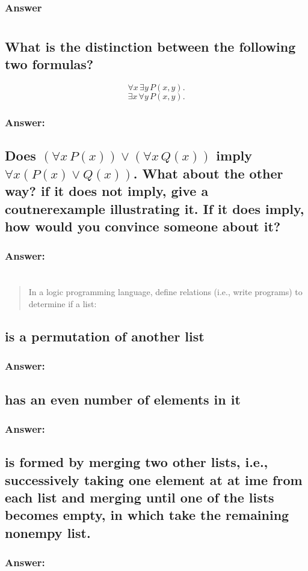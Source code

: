 \documentclass[titlepage]{article}\usepackage[]{graphicx}\usepackage[]{color}
\begin{document}
  \subsubsection{Answer}




  \section{}
  \subsection{What is the distinction between the following two formulas?}
  \[ \forall x \, \exists y \, P(x,y). \]
  \[ \exists x \, \forall y \, P(x,y). \]
  \subsubsection{Answer:}



  \subsection{Does $(\forall x \, P(x)) \lor (\forall x \, Q(x))$ imply $\forall
    x (P(x) \lor Q(x))$. What about the other way? if it does not imply, give a
    coutnerexample illustrating it. If it does imply, how would you convince
    someone about it?}
    \subsubsection{Answer:}

\section{ }
  \begin{quote}
    {In a logic programming language, define relations (i.e., write programs)
    to determine if a list:}
  \end{quote}

  \subsection{is a permutation of another list}
  \subsubsection{Answer:}

  \subsection{has an even number of elements in it}
  \subsubsection{Answer:}

  \subsection{is formed by merging two other lists, i.e., successively
  taking one element at at ime from each list and merging until one of the
lists becomes empty, in which take the remaining nonempy list.}
  \subsubsection{Answer:}


  
\end{document}
